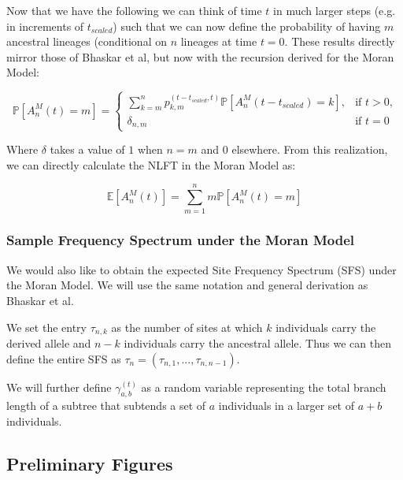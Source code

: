 \documentclass[10pt]{article}
\begin{document}
Now that we have the following we can think of time $t$ in much larger steps (e.g. in increments of $t_{scaled}$) such that we can now define the probability of having $m$ ancestral lineages (conditional on $n$ lineages at time $t = 0$. These results directly mirror those of Bhaskar et al, but now with the recursion derived for the Moran Model:

 \begin{equation*}
	 \mathbb{P}[A^M_n(t) = m] =
	 \begin{cases} 
		 \sum^n_{k=m}  p^{(t-t_{scaled}, t)}_{k,m} \mathbb{P}[A^M_n (t-t_{scaled}) = k],  &\text{if $t > 0$,}
	 	 \\
		 \delta_{n,m} &\text{if $t = 0$}
	 \end{cases}
 \end{equation*}

 Where $\delta$ takes a value of $1$ when $n=m$ and $0$ elsewhere. From this realization, we can directly calculate the NLFT in the Moran Model as:

 \begin{equation*}
	 \mathbb{E}[A^M_n(t)] = \sum^n_{m=1} m \mathbb{P}[A^M_n (t) = m]
 \end{equation*}

\subsubsection{Sample Frequency Spectrum under the Moran Model}

We would also like to obtain the expected Site Frequency Spectrum (SFS) under the Moran Model. We will use the same notation and general derivation as Bhaskar et al.

We set the entry $\tau_{n,k}$ as the number of sites at which $k$ individuals carry the derived allele and $n-k$ individuals carry the ancestral allele. Thus we can then define the entire SFS as $\tau_n = (\tau_{n,1}, ..., \tau_{n,n-1})$. 

We will further define $\gamma^{(t)}_{a,b}$ as a random variable representing the total branch length of a subtree that subtends a set of $a$ individuals in a larger set of $a+b$ individuals. 




\newpage

\subsection{Preliminary Figures}
\end{document}
